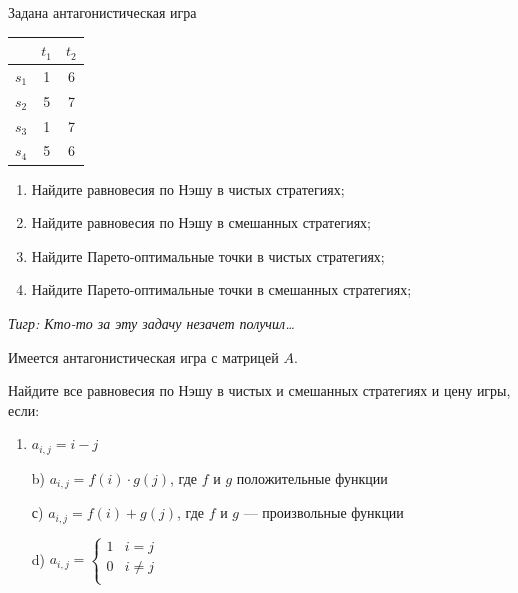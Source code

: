 \begin{problem}

Задана антагонистическая игра\par
\begin{tabular}{|c|c|c|}
\hline
& $t_{1}$ & $t_{2}$ \\
\hline
$s_{1}$ & 1 & 6 \\
$s_{2}$ & 5 & 7 \\
$s_{3}$ & 1 & 7 \\
$s_{4}$ & 5 & 6 \\
\hline
\end{tabular}
\begin{enumerate}
\item	Найдите равновесия по Нэшу в чистых стратегиях;\par
\item 	Найдите равновесия по Нэшу в смешанных стратегиях;\par
\item 	Найдите Парето-оптимальные точки в чистых стратегиях;\par
\item Найдите Парето-оптимальные точки в смешанных стратегиях;\par
\end{enumerate}
{\it Тигр: Кто-то за эту задачу незачет получил\ldots }



\begin{sol}

\end{sol}
\end{problem}



\begin{problem}
 Имеется антагонистическая игра с матрицей $A$.

Найдите все равновесия по Нэшу в чистых и смешанных стратегиях и
цену игры, если:

\begin{enumerate}
\item $a_{i,j}=i-j$

b) $a_{i,j}=f(i)\cdot g(j)$, где $f$ и $g$ положительные функции

с) $a_{i,j}=f(i)+g(j)$, где $f$ и $g$ --- произвольные функции

d) $a_{i,j}=\left\{
\begin{array}{cc}
  1 & i=j \\
  0 & i\neq j \\
\end{array}\right.$
\end{enumerate}


\begin{sol}

\end{sol}
\end{problem}


